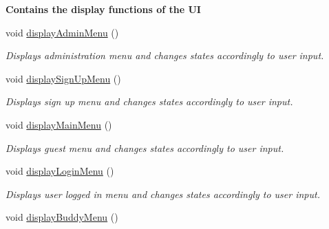 \begin{Indent}{\bf Contains the display functions of the U\+I}\par
\begin{DoxyCompactItemize}
\item 
\hypertarget{class_lyfter_a9ec8e4fbb667039eb991b66a46d7d40a}{void \hyperlink{class_lyfter_a9ec8e4fbb667039eb991b66a46d7d40a}{display\+Admin\+Menu} ()}\label{class_lyfter_a9ec8e4fbb667039eb991b66a46d7d40a}

\begin{DoxyCompactList}\small\item\em Displays administration menu and changes states accordingly to user input. \end{DoxyCompactList}\item 
\hypertarget{class_lyfter_a48eb1bcbe6efb13a3532148bf1e39b5a}{void \hyperlink{class_lyfter_a48eb1bcbe6efb13a3532148bf1e39b5a}{display\+Sign\+Up\+Menu} ()}\label{class_lyfter_a48eb1bcbe6efb13a3532148bf1e39b5a}

\begin{DoxyCompactList}\small\item\em Displays sign up menu and changes states accordingly to user input. \end{DoxyCompactList}\item 
\hypertarget{class_lyfter_a82f947743d9c85b6239689c3825ff035}{void \hyperlink{class_lyfter_a82f947743d9c85b6239689c3825ff035}{display\+Main\+Menu} ()}\label{class_lyfter_a82f947743d9c85b6239689c3825ff035}

\begin{DoxyCompactList}\small\item\em Displays guest menu and changes states accordingly to user input. \end{DoxyCompactList}\item 
\hypertarget{class_lyfter_aa4fd1663553d3e3a81519c720854477e}{void \hyperlink{class_lyfter_aa4fd1663553d3e3a81519c720854477e}{display\+Login\+Menu} ()}\label{class_lyfter_aa4fd1663553d3e3a81519c720854477e}

\begin{DoxyCompactList}\small\item\em Displays user logged in menu and changes states accordingly to user input. \end{DoxyCompactList}\item 
\hypertarget{class_lyfter_ac84f43d2e513c9a4e9290d6a255a7229}{void \hyperlink{class_lyfter_ac84f43d2e513c9a4e9290d6a255a7229}{display\+Buddy\+Menu} ()}\label{class_lyfter_ac84f43d2e513c9a4e9290d6a255a7229}


\end{DoxyCompactItemize}
\end{Indent}
